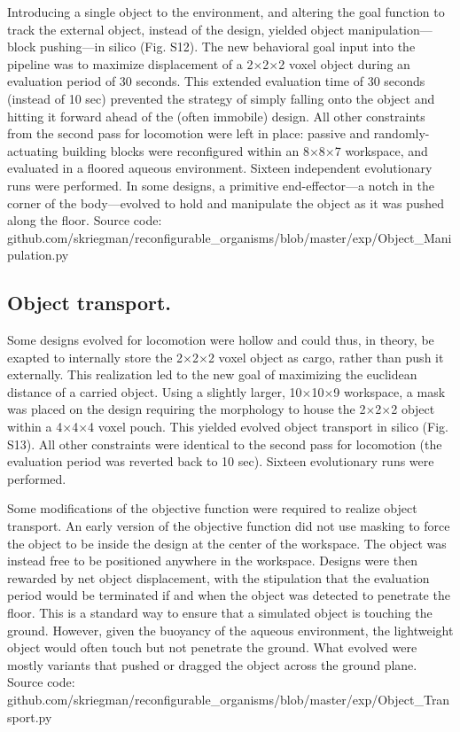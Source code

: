 Introducing a single object to the environment, and altering the goal function to track the external object, instead of the design, yielded object manipulation---block pushing---in silico (Fig. S12). The new behavioral goal input into the pipeline was to maximize displacement of a 2{$\times$}2{$\times$}2 voxel object during an evaluation period of 30 seconds. This extended evaluation time of 30 seconds (instead of 10 sec) prevented the strategy of simply falling onto the object and hitting it forward ahead of the (often immobile) design. All other constraints from the second pass for locomotion were left in place: passive and randomly-actuating building blocks were reconfigured within an 8{$\times$}8{$\times$}7 workspace, and evaluated in a floored aqueous environment. Sixteen independent evolutionary runs were performed. In some designs, a primitive end-effector---a notch in the corner of the body---evolved to hold and manipulate the object as it was pushed along the floor. Source code: github.com/skriegman/reconfigurable\_organisms/blob/master/exp/Object\_Manipulation.py

\subsection*{Object transport.}

Some designs evolved for locomotion were hollow and could thus, in theory, be exapted to internally store the 2{$\times$}2{$\times$}2 voxel object as cargo, rather than push it externally. This realization led to the new goal of maximizing the euclidean distance of a carried object. Using a slightly larger, 10{$\times$}10{$\times$}9 workspace, a mask was placed on the design requiring the morphology to house the 2{$\times$}2{$\times$}2 object within a 4{$\times$}4{$\times$}4 voxel pouch. This yielded evolved object transport in silico (Fig. S13). All other constraints were identical to the second pass for locomotion (the evaluation period was reverted back to 10 sec). Sixteen evolutionary runs were performed.

Some modifications of the objective function were required to realize object transport. An early version of the objective function did not use masking to force the object to be inside the design at the center of the workspace. The object was instead free to be positioned anywhere in the workspace. Designs were then rewarded by net object displacement, with the stipulation that the evaluation period would be terminated if and when the object was detected to penetrate the floor. This is a standard way to ensure that a simulated object is touching the ground. However, given the buoyancy of the aqueous environment, the lightweight object would often touch but not penetrate the ground. What evolved were mostly variants that pushed or dragged the object across the ground plane. Source code: github.com/skriegman/reconfigurable\_organisms/blob/master/exp/Object\_Transport.py


